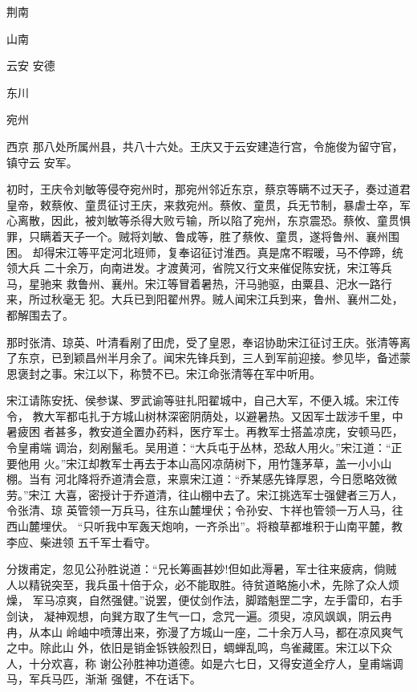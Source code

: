 荆南

山南

云安
安德

东川

宛州

西京
那八处所属州县，共八十六处。王庆又于云安建造行宫，令施俊为留守官，镇守云
安军。

初时，王庆令刘敏等侵夺宛州时，那宛州邻近东京，蔡京等瞒不过天子，奏过道君
皇帝，敕蔡攸、童贯征讨王庆，来救宛州。蔡攸、童贯，兵无节制，暴虐士卒，军
心离散，因此，被刘敏等杀得大败亏输，所以陷了宛州，东京震恐。蔡攸、童贯惧
罪，只瞒着天子一个。贼将刘敏、鲁成等，胜了蔡攸、童贯，遂将鲁州、襄州围困。
却得宋江等平定河北班师，复奉诏征讨淮西。真是席不暇暖，马不停蹄，统领大兵
二十余万，向南进发。才渡黄河，省院又行文来催促陈安抚，宋江等兵马，星驰来
救鲁州、襄州。宋江等冒着暑热，汗马驰驱，由粟县、汜水一路行来，所过秋毫无
犯。大兵已到阳翟州界。贼人闻宋江兵到来，鲁州、襄州二处，都解围去了。

那时张清、琼英、叶清看剐了田虎，受了皇恩，奉诏协助宋江征讨王庆。张清等离
了东京，已到颖昌州半月余了。闻宋先锋兵到，三人到军前迎接。参见毕，备述蒙
恩褒封之事。宋江以下，称赞不已。宋江命张清等在军中听用。

宋江请陈安抚、侯参谋、罗武谕等驻扎阳翟城中，自己大军，不便入城。宋江传令，
教大军都屯扎于方城山树林深密阴荫处，以避暑热。又因军士跋涉千里，中暑疲困
者甚多，教安道全置办药料，医疗军士。再教军士搭盖凉庑，安顿马匹，令皇甫端
调治，刻剐鬣毛。吴用道：“大兵屯于丛林，恐敌人用火。”宋江道：“正要他用
火。”宋江却教军士再去于本山高冈凉荫树下，用竹篷茅草，盖一小小山棚。当有
河北降将乔道清会意，来禀宋江道：“乔某感先锋厚恩，今日愿略效微劳。”宋江
大喜，密授计于乔道清，往山棚中去了。宋江挑选军士强健者三万人，令张清、琼
英管领一万兵马，往东山麓埋伏；令孙安、卞祥也管领一万人马，往西山麓埋伏。
“只听我中军轰天炮响，一齐杀出”。将粮草都堆积于山南平麓，教李应、柴进领
五千军士看守。

分拨甫定，忽见公孙胜说道：“兄长筹画甚妙!但如此溽暑，军士往来疲病，倘贼
人以精锐突至，我兵虽十倍于众，必不能取胜。待贫道略施小术，先除了众人烦燥，
军马凉爽，自然强健。”说罢，便仗剑作法，脚踏魁罡二字，左手雷印，右手剑诀，
凝神观想，向巽方取了生气一口，念咒一遍。须臾，凉风飒飒，阴云冉冉，从本山
岭岫中喷薄出来，弥漫了方城山一座，二十余万人马，都在凉风爽气之中。除此山
外，依旧是销金铄铁般烈日，蜩蝉乱鸣，鸟雀藏匿。宋江以下众人，十分欢喜，称
谢公孙胜神功道德。如是六七日，又得安道全疗人，皇甫端调马，军兵马匹，渐渐
强健，不在话下。

